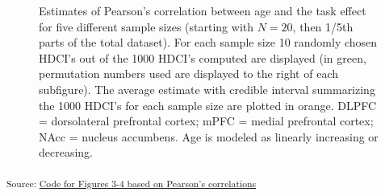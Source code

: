 \documentclass[
  letterpaper,
  DIV=11,
  numbers=noendperiod]{scrartcl}
\begin{document}
\begin{figure}[H]


\caption{\label{fig-3}Estimates of Pearson's correlation between age and
the task effect for five different sample sizes (starting with \(N=20\),
then 1/5th parts of the total dataset). For each sample size 10 randomly
chosen HDCI's out of the 1000 HDCI's computed are displayed (in green,
permutation numbers used are displayed to the right of each subfigure).
The average estimate with credible interval summarizing the 1000 HDCI's
for each sample size are plotted in orange. DLPFC = dorsolateral
prefrontal cortex; mPFC = medial prefrontal cortex; NAcc = nucleus
accumbens. Age is modeled as linearly increasing or decreasing.}

\end{figure}%

\textsubscript{Source:
\href{https://eduardklap.github.io/sample-size-fmri/notebooks/figures-correlations-preview.html\#cell-fig-3}{Code
for Figures 3-4 based on Pearson's correlations}}
\end{document}
